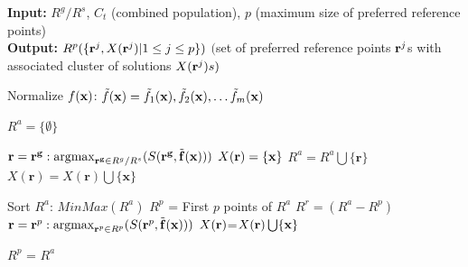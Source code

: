 \documentclass[review]{elsarticle}
\begin{document}
\begin{algorithm}[!h]
	
	\textbf{Input:} $R^g/R^s$, $C_t$ (combined population), $p$ (maximum size of preferred reference points)\\
	\textbf{Output:}  $R^p(\{{\bf r}^j,X({\bf r}^j)|1\le j\le p\})$ $($set of preferred reference points ${\bf r}^j$s with associated cluster of solutions $X({{\bf r}^j})s)$
	
	\begin{algorithmic}[1]
		
			\STATE Normalize $f({\bf x})$: $\tilde{f}({\bf x}) = \tilde{f}_1({\bf x}),\tilde{f}_2({\bf x}),\ldots\tilde{f}_m({\bf x})$
		\ENDFOR
		
		
		\STATE $R^{a} = \{\emptyset\}$ 
		
		\STATE $\mathbf{r}= {\mathbf{r^g}:\argmax_{\mathbf{r^g}\in R^g/R^s}({S(\mathbf{r^g},\tilde{\bf f}({\bf x})))}}$
		\STATE $X(\mathbf{r}) =\{\bf x\}$
		\STATE $R^a = R^a \bigcup \{\mathbf{r}\}$
		\ELSE
		\STATE $X(\mathbf{r}) = X(\mathbf{r}) \bigcup \{\mathbf{x}\}$ 
		\ENDIF
		\ENDFOR
		
		
		\STATE Sort $R^a$: $MinMax(R^a)$
		\STATE $R^p$ = First $p$ points of $R^a$
		\STATE $R^r = (R^a-R^p)$
		\STATE $\mathbf{r}= {{{\bf r}^p}:\argmax_{{{\bf r}^p}\in R^p}({S({{\bf r}^p},\tilde{\bf f}({\bf x})))}}$
		\STATE $X({\bf r})$=$X({\bf r}) \bigcup \{\bf x\}$ 
		\ENDFOR
		
		\ENDFOR	
		
		\ELSE	
		\STATE $R^p$ = $R^a$	 	 	
		\ENDIF
		
	\end{algorithmic}
	\caption{$PreferredReferencePoint(C_t, R^g/R^s, p)$ }
	
	\label{alg:prefferedReferencePoint}
\end{algorithm}



\end{document}
